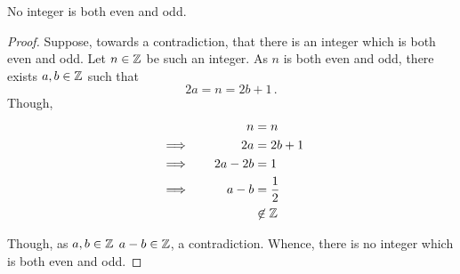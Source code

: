 \guard




\begin{prop}
\label{prop:noIntegerBothEvenAndOdd}
  No integer is both even and odd.
\end{prop}
\begin{proof}
  Suppose, towards a contradiction, that there is an integer which is both even and odd.
  Let $n\in\mathbb{Z}$ be such an integer.
  As $n$ is both even and odd, there exists $a,b\in\mathbb{Z}$ such that \[ 2a=n=2b+1\,.\]
  Though,
  \begin{alignat*}{2}
    && n &=n \\
    &\implies\quad & 2a &= 2b + 1 \\
    &\implies\quad & 2a-2b &= 1 \\
    &\implies\quad & a-b &= \frac{1}{2}\\
    &&&\not\in\mathbb{Z}
  \end{alignat*}

  Though, as $a,b\in\mathbb{Z}$ $a-b\in\mathbb{Z}$, a contradiction.
  Whence, there is no integer which is both even and odd.
\end{proof}
